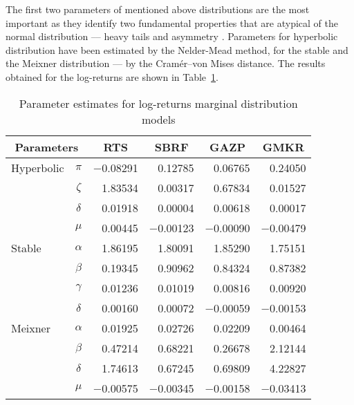 \documentclass{llncs}
\begin{document}
The first two parameters of mentioned above distributions %
are the most important as they identify two fundamental properties that are atypical of the normal distribution –– heavy tails and asymmetry \cite{Stoyanov2013}. Parameters for hyperbolic distribution have been estimated by the Nelder-Mead method, for the stable and the Meixner distribution –– by the Cramér–von Mises distance. The results obtained for the log-returns are shown in Table~\ref{dist-pars}. %

\begin{table}[t] 
\centering 
\caption{Parameter estimates for log-returns marginal
distribution models}
\label{dist-pars}
\setlength{\tabcolsep}{4pt}
\begin{tabular}{lcrrrr}
\hline \multicolumn{2}{c}{Parameters} & \multicolumn{1}{c}{RTS} &
\multicolumn{1}{c}{SBRF} & \multicolumn{1}{c}{GAZP} &
\multicolumn{1}{c}{GMKR} \bigstrut \\ \hline
Hyperbolic  &    $\pi$ & $-$0.08291 &    0.12785 &    0.06765 &    0.24050 \bigstrut[t] \\
            &  $\zeta$ &    1.83534 &    0.00317 &    0.67834 &    0.01527 \\
            & $\delta$ &    0.01918 &    0.00004 &    0.00618 &    0.00017 \\
            &    $\mu$ &    0.00445 & $-$0.00123 & $-$0.00090 & $-$0.00479 \bigstrut[b] \\ \hline
Stable      & $\alpha$ &    1.86195 &    1.80091 &    1.85290 &    1.75151 \bigstrut[t] \\
            &  $\beta$ &    0.19345 &    0.90962 &    0.84324 &    0.87382 \\
            & $\gamma$ &    0.01236 &    0.01019 &    0.00816 &    0.00920 \\
            & $\delta$ &    0.00160 &    0.00072 & $-$0.00059 & $-$0.00153 \bigstrut[b] \\ \hline
Meixner     & $\alpha$ &    0.01925 &    0.02726 &    0.02209 &    0.00464 \bigstrut[t] \\
            &  $\beta$ &    0.47214 &    0.68221 &    0.26678 &    2.12144 \\
            & $\delta$ &    1.74613 &    0.67245 &    0.69809 &    4.22827 \\
            &    $\mu$ & $-$0.00575 & $-$0.00345 & $-$0.00158 & $-$0.03413 \bigstrut[b] \\ \hline
\end{tabular}
\end{table}
\end{document}
